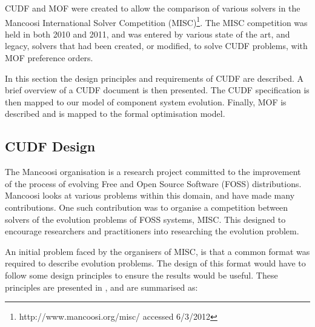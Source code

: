 CUDF and MOF were created to allow the comparison of various solvers in the Mancoosi International Solver Competition (MISC)\footnote{http://www.mancoosi.org/misc/ accessed 6/3/2012}.
The MISC competition was held in both 2010 and 2011,
and was entered by various state of the art, and legacy, solvers that had been created, or modified, to solve CUDF problems, with MOF preference orders.

In this section the design principles and requirements of CUDF are described.
A brief overview of a CUDF document is then presented.
The CUDF specification is then mapped to our model of component system evolution.
Finally, MOF is described and is mapped to the formal optimisation model.

\subsection{CUDF Design}
\label{formal.cudfDesign}
The Mancoosi organisation is a research project committed to the improvement of the process of evolving Free and Open Source Software (FOSS) distributions.
Mancoosi looks at various problems within this domain, and have made many contributions.
One such contribution was to organise a competition between solvers of the evolution problems of FOSS systems, MISC.
This designed to encourage researchers and practitioners into researching the evolution problem.

An initial problem faced by the organisers of MISC, is that a common format was required to describe evolution problems.
The design of this format would have to follow some design principles to ensure the results would be useful.
These principles are presented in \citep{treinen2009common}, and are summarised as:

